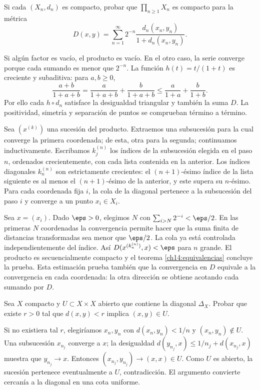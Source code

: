 \begin{ejercicio}\label{ej:lectura-14-1}
Si cada $(X_n,d_n)$ es compacto, probar que $\prod_{n\ge1}X_n$ es compacto para la métrica
\[
D(x,y)=\sum_{n=1}^\infty 2^{-n}\frac{d_n(x_n,y_n)}{1+d_n(x_n,y_n)}.
\]
\end{ejercicio}
\begin{solucion}
Si algún factor es vacío, el producto es vacío. En el otro caso, la serie converge porque cada sumando es menor que $2^{-n}$. La función $h(t)=t/(1+t)$ es creciente y subaditiva: para $a,b\ge0$,
\[
\frac{a+b}{1+a+b}=\frac a{1+a+b}+\frac b{1+a+b}
\le\frac a{1+a}+\frac b{1+b}.
\]
Por ello cada $h\circ d_n$ satisface la desigualdad triangular y también la suma $D$. La positividad, simetría y separación de puntos se comprueban término a término.

Sea $(x^{(k)})$ una sucesión del producto. Extraemos una subsucesión para la cual converge la primera coordenada; de esta, otra para la segunda; continuamos inductivamente. Escribamos $k_j^{(n)}$ los índices de la subsucesión elegida en el paso $n$, ordenados crecientemente, con cada lista contenida en la anterior. Los índices diagonales $k_n^{(n)}$ son estrictamente crecientes: el $(n+1)$-ésimo índice de la lista siguiente es al menos el $(n+1)$-ésimo de la anterior, y este supera su $n$-ésimo. Para cada coordenada fija $i$, la cola de la diagonal pertenece a la subsucesión del paso $i$ y converge a un punto $x_i\in X_i$.

Sea $x=(x_i)$. Dado $\eps>0$, elegimos $N$ con $\sum_{i>N}2^{-i}<\eps/2$. En las primeras $N$ coordenadas la convergencia permite hacer que la suma finita de distancias transformadas sea menor que $\eps/2$. La cola ya está controlada independientemente del índice. Así $D(x^{(k_n^{(n)})},x)<\eps$ para $n$ grande. El producto es secuencialmente compacto y el teorema \ref{ch14:equivalencias} concluye la prueba. Esta estimación prueba también que la convergencia en $D$ equivale a la convergencia en cada coordenada: la otra dirección se obtiene acotando cada sumando por $D$.
\end{solucion}

\begin{ejercicio}\label{ej:lectura-14-2}
Sea $X$ compacto y $U\subset X\times X$ abierto que contiene la diagonal $\Delta_X$. Probar que existe $r>0$ tal que $d(x,y)<r$ implica $(x,y)\in U$.
\end{ejercicio}
\begin{solucion}
Si no existiera tal $r$, elegiríamos $x_n,y_n$ con $d(x_n,y_n)<1/n$ y $(x_n,y_n)\notin U$. Una subsucesión $x_{n_j}$ converge a $x$; la desigualdad $d(y_{n_j},x)\le1/n_j+d(x_{n_j},x)$ muestra que $y_{n_j}\to x$. Entonces $(x_{n_j},y_{n_j})\to(x,x)\in U$. Como $U$ es abierto, la sucesión pertenece eventualmente a $U$, contradicción. El argumento convierte cercanía a la diagonal en una cota uniforme.
\end{solucion}

